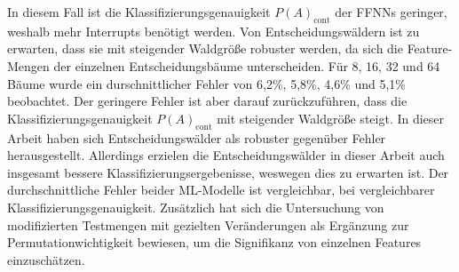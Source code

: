 In diesem Fall ist die Klassifizierungsgenauigkeit $P(A)_{\text{cont}}$ der FFNNs geringer, weshalb mehr Interrupts benötigt werden.
\newline
\newline
Von Entscheidungswäldern ist zu erwarten, dass sie mit steigender Waldgröße robuster werden, da sich die Feature-Mengen der einzelnen Entscheidungsbäume unterscheiden.
Für 8, 16, 32 und 64 Bäume wurde ein durschnittlicher Fehler von 6,2\%, 5,8\%, 4,6\% und 5,1\% beobachtet.
Der geringere Fehler ist aber darauf zurückzuführen, dass die Klassifizierungsgenauigkeit $P(A)_{\text{cont}}$ mit steigender Waldgröße steigt.
\newpage
In dieser Arbeit haben sich Entscheidungswälder als robuster gegenüber Fehler herausgestellt.
Allerdings erzielen die Entscheidungswälder in dieser Arbeit auch insgesamt bessere Klassifizierungsergebenisse, weswegen dies zu erwarten ist.
Der durchschnittliche Fehler beider ML-Modelle ist vergleichbar, bei vergleichbarer Klassifizierungsgenauigkeit.
Zusätzlich hat sich die Untersuchung von modifizierten Testmengen mit gezielten Veränderungen als Ergänzung zur Permutationwichtigkeit bewiesen,
um die Signifikanz von einzelnen Features einzuschätzen.